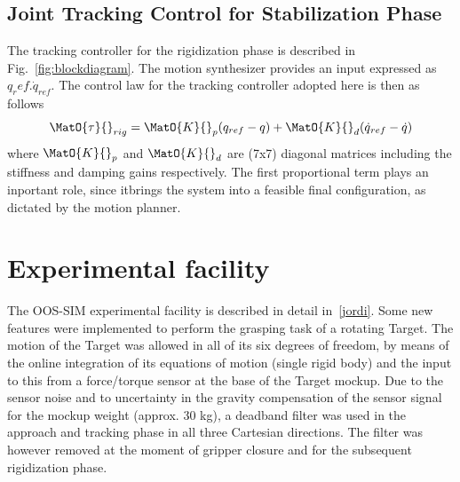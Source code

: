 
%
\subsection{Joint Tracking Control for Stabilization Phase}
%
% 
The tracking controller for the rigidization phase is described in Fig.~\ref{fig:blockdiagram}. The motion synthesizer provides an input expressed as $q_ref. \dot{q}_{ref}$. The control law for the tracking controller adopted here is then as follows
\begin{equation}
\MatO{\tau}{}_{rig} = \MatO{K}{}_{p} (q_{ref}-q) + \MatO{K}{}_{d} (\dot{q}{}_{ref}-\dot{q})
\label{eq:rigidiz_control}
\end{equation}
where $\MatO{K}{}_{p}$ and $\MatO{K}{}_{d}$ are (7x7) diagonal matrices including the stiffness and damping gains respectively. The first proportional term plays an inportant role, since itbrings the system into a feasible final configuration, as dictated by the motion planner. 
%
\section{Experimental facility}
%
The OOS-SIM experimental facility is described in detail in~\ref{jordi}. Some new features were implemented to perform the grasping task of a rotating Target. The motion of the Target was allowed in all of its six degrees of freedom, by means of the online integration of its equations of motion (single rigid body) and the input to this from a force/torque sensor at the base of the Target mockup. Due to the sensor noise and to uncertainty in the gravity compensation of the sensor signal for the mockup weight (approx. 30 kg), a deadband filter was used in the approach and tracking phase in all three Cartesian directions. The filter was however removed at the moment of gripper closure and for the subsequent rigidization phase.

